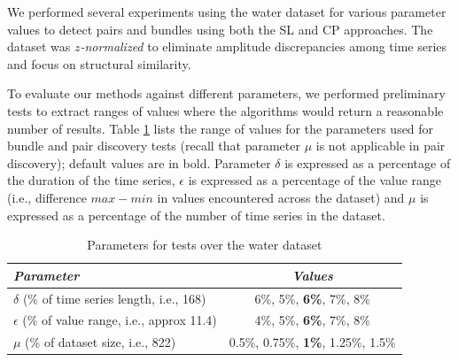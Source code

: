 \label{subsubsec:pair_bundle}
We performed several experiments using the water dataset for various parameter values to detect pairs and bundles using both the SL and CP approaches. The dataset was \textit{$z$-normalized} to eliminate amplitude discrepancies among time series and focus on structural similarity.

To evaluate our methods against different parameters, we performed preliminary tests to extract ranges of values where the algorithms would return a reasonable number of results. Table \ref{tab:parameters1_join} lists the range of values for the parameters used for bundle and pair discovery tests (recall that parameter $\mu$ is not applicable in pair discovery); default values are in bold. Parameter $\delta$ is expressed as a percentage of the duration of the time series, $\epsilon$ is expressed as a percentage of the value range (i.e., difference $max-min$ in values encountered across the dataset) and $\mu$ is expressed as a percentage of the number of time series in the dataset.

\begin{table}[!ht]
\centering
\caption{Parameters for tests over the water dataset}
\begin{small}
\begin{tabular}{lc} 
\hline
{\em Parameter} &{\em Values} \\
\hline
$\delta$ (\% of time series length, i.e., 168) & 6\%, 5\%, \textbf{6\%}, 7\%, 8\% \\
$\epsilon$ (\% of value range, i.e., approx 11.4) & 4\%, 5\%, \textbf{6\%}, 7\%, 8\% \\
$\mu$ (\% of dataset size, i.e., 822) & 0.5\%, 0.75\%, \textbf{1\%}, 1.25\%, 1.5\% \\
\hline
\end{tabular}
\end{small}
\label{tab:parameters1_join}
\end{table}


